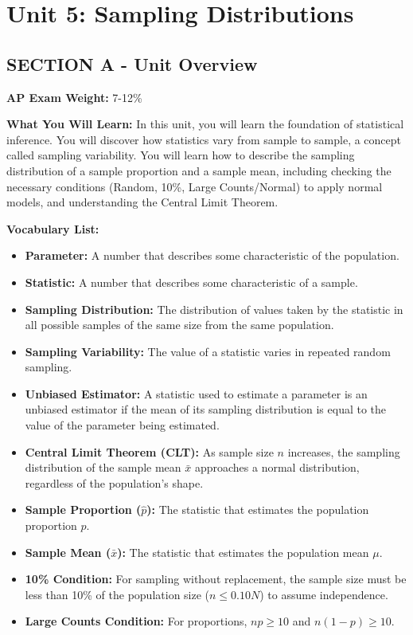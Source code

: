 ﻿%
\chapter{Unit 5: Sampling Distributions}

\section{SECTION A - Unit Overview}
\textbf{AP Exam Weight:} 7-12\%

\textbf{What You Will Learn:} In this unit, you will learn the foundation of statistical inference. You will discover how statistics vary from sample to sample, a concept called sampling variability. You will learn how to describe the sampling distribution of a sample proportion and a sample mean, including checking the necessary conditions (Random, 10\%, Large Counts/Normal) to apply normal models, and understanding the Central Limit Theorem.

\textbf{Vocabulary List:}
\begin{itemize}
    \item \textbf{Parameter:} A number that describes some characteristic of the population.
    \item \textbf{Statistic:} A number that describes some characteristic of a sample.
    \item \textbf{Sampling Distribution:} The distribution of values taken by the statistic in all possible samples of the same size from the same population.
    \item \textbf{Sampling Variability:} The value of a statistic varies in repeated random sampling.
    \item \textbf{Unbiased Estimator:} A statistic used to estimate a parameter is an unbiased estimator if the mean of its sampling distribution is equal to the value of the parameter being estimated.
    \item \textbf{Central Limit Theorem (CLT):} As sample size $n$ increases, the sampling distribution of the sample mean $\bar{x}$ approaches a normal distribution, regardless of the population's shape.
    \item \textbf{Sample Proportion ($\hat{p}$):} The statistic that estimates the population proportion $p$.
    \item \textbf{Sample Mean ($\bar{x}$):} The statistic that estimates the population mean $\mu$.
    \item \textbf{10\% Condition:} For sampling without replacement, the sample size must be less than 10\% of the population size ($n \leq 0.10N$) to assume independence.
    \item \textbf{Large Counts Condition:} For proportions, $np \geq 10$ and $n(1-p) \geq 10$.
\end{itemize}

